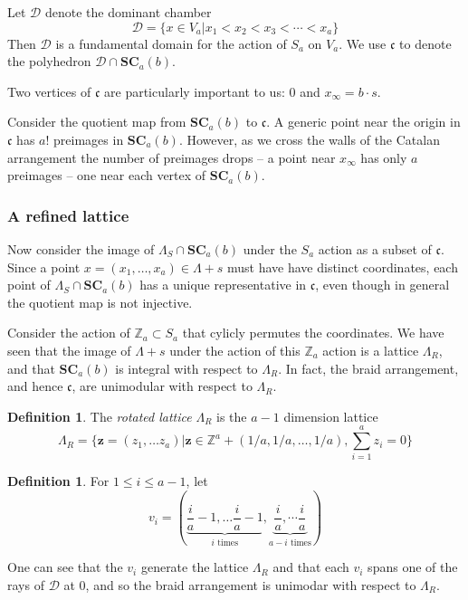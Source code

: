 \documentclass{amsart}[12pt]
\theoremstyle{definition}
\newtheorem{definition}[dummy]{Definition}
\newcommand{\Z}{\mathbb{Z}}
\newcommand{\SC}{\mathbf{SC}}
\newcommand{\polyh}{\mathfrak{c}}
\newcommand{\dominant}{\mathcal{D}}
\begin{document}
Let $\dominant$ denote the dominant chamber $$\dominant=\{x\in V_a|x_1< x_2< x_3<\cdots < x_a\}$$
Then $\dominant$ is a fundamental domain for the action of $S_a$ on $V_a$.  We use $\polyh$ to denote the polyhedron $\dominant\cap\SC_{a}(b)$.  

Two vertices of $\polyh$ are particularly important to us: $0$ and  $x_\infty=b\cdot s$.

Consider the quotient map from $\SC_a(b)$ to $\polyh$.  A generic point near the origin in $\polyh$ has $a!$ preimages in $\SC_a(b)$.  However, as we cross the walls of the Catalan arrangement the number of preimages drops -- a point near $x_\infty$ has only $a$ preimages -- one near each vertex of $\SC_a(b)$. 


\subsubsection{A refined lattice}

Now consider the image of $\Lambda_S\cap \SC_{a}(b)$ under the $S_a$ action as a subset of $\polyh$.   Since a point $x=(x_1,\dots,x_a)\in\Lambda+s$ must have have distinct coordinates, each point of $\Lambda_S\cap \SC_a(b)$ has a unique representative in $\polyh$, even though in general the quotient map is not injective.

Consider the action of $\Z_a\subset S_a$ that cylicly permutes the coordinates.  We have seen that the image of $\Lambda+s$ under the action of this $\Z_a$ action is a lattice $\Lambda_R$, and that $\SC_a(b)$ is integral with respect to $\Lambda_R$.  In fact, the braid arrangement, and hence $\polyh$, are unimodular with respect to $\Lambda_R$.  

\begin{definition} The \emph{rotated lattice} $\Lambda_R$ is the $a-1$ dimension lattice
$$\Lambda_R=\{\mathbf{z}=(z_1,\dots z_a)|\mathbf{z}\in\Z^a+(1/a,1/a,\dots, 1/a), \sum_{i=1}^a z_i=0\}$$
\end{definition}

\begin{definition}
For $1\leq i\leq a-1$, let $$v_i=\left(\underbrace{\frac{i}{a}-1,\dots \frac{i}{a}-1}_{i \text{ times}},\underbrace{ \frac{i}{a},\dotsm\frac{i}{a}}_{a-i \text{ times}}\right)$$
\end{definition}

One can see that the $v_i$ generate the lattice $\Lambda_R$ and that each $v_i$ spans one of the rays of $\dominant$ at $0$, and so the braid arrangement is unimodar with respect to $\Lambda_R$.
\end{document}
